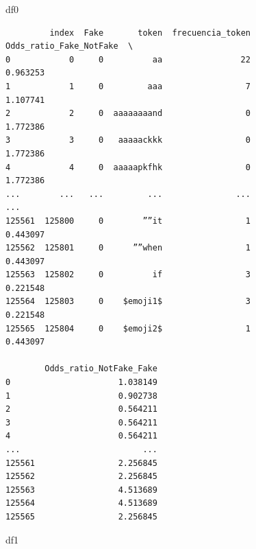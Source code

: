 \documentclass[
  11pt,
  a4paper,
]{article}
\newenvironment{Shaded}{\begin{snugshade}}{\end{snugshade}}
\newcommand{\NormalTok}[1]{#1}
\begin{document}
\begin{Shaded}
\begin{Highlighting}[]
\NormalTok{df0}
\end{Highlighting}
\end{Shaded}

\begin{verbatim}
         index  Fake       token  frecuencia_token  Odds_ratio_Fake_NotFake  \
0            0     0          aa                22                 0.963253   
1            1     0         aaa                 7                 1.107741   
2            2     0  aaaaaaaand                 0                 1.772386   
3            3     0   aaaaackkk                 0                 1.772386   
4            4     0  aaaaapkfhk                 0                 1.772386   
...        ...   ...         ...               ...                      ...   
125561  125800     0        ””it                 1                 0.443097   
125562  125801     0      ””when                 1                 0.443097   
125563  125802     0          if                 3                 0.221548   
125564  125803     0    $emoji1$                 3                 0.221548   
125565  125804     0    $emoji2$                 1                 0.443097   

        Odds_ratio_NotFake_Fake  
0                      1.038149  
1                      0.902738  
2                      0.564211  
3                      0.564211  
4                      0.564211  
...                         ...  
125561                 2.256845  
125562                 2.256845  
125563                 4.513689  
125564                 4.513689  
125565                 2.256845  
\end{verbatim}

\begin{Shaded}
\begin{Highlighting}[]
\NormalTok{df1}
\end{Highlighting}
\end{Shaded}
\end{document}
